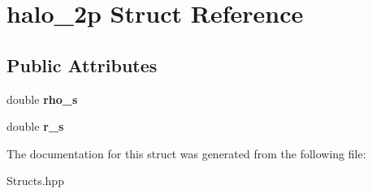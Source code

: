 \hypertarget{structhalo__2p}{}\section{halo\+\_\+2p Struct Reference}
\label{structhalo__2p}
\subsection*{Public Attributes}
\begin{DoxyCompactItemize}
\item 
\mbox{\label{structhalo__2p_adc435ec1a05f25ce7e5838cd78488e9a}} 
double {\bfseries rho\+\_\+s}
\item 
\mbox{\label{structhalo__2p_ae39948a26326083311108214b1ba7cd5}} 
double {\bfseries r\+\_\+s}
\end{DoxyCompactItemize}


The documentation for this struct was generated from the following file\+:\begin{DoxyCompactItemize}
\item 
Structs.\+hpp\end{DoxyCompactItemize}
